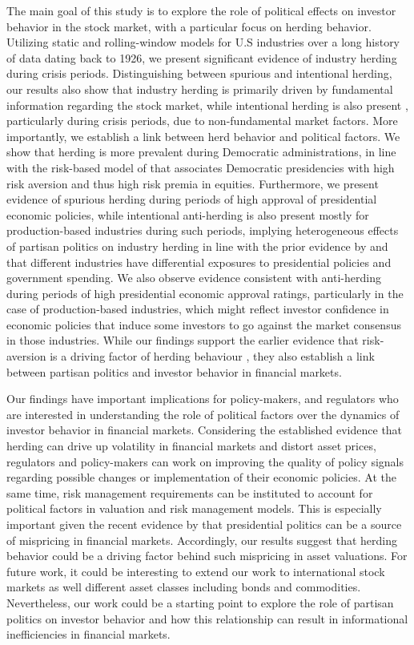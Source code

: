 \documentclass[
  letterpaper,
  DIV=11,
  numbers=noendperiod]{scrartcl}
\begin{document}
The main goal of this study is to explore the role of political effects
on investor behavior in the stock market, with a particular focus on
herding behavior. Utilizing static and rolling-window models for U.S
industries over a long history of data dating back to 1926, we present
significant evidence of industry herding during crisis periods.
Distinguishing between spurious and intentional herding, our results
also show that industry herding is primarily driven by fundamental
information regarding the stock market, while intentional herding is
also present , particularly during crisis periods, due to
non-fundamental market factors. More importantly, we establish a link
between herd behavior and political factors. We show that herding is
more prevalent during Democratic administrations, in line with the
risk-based model of \citet{pastor2020political} that associates
Democratic presidencies with high risk aversion and thus high risk
premia in equities. Furthermore, we present evidence of spurious herding
during periods of high approval of presidential economic policies, while
intentional anti-herding is also present mostly for production-based
industries during such periods, implying heterogeneous effects of
partisan politics on industry herding in line with the prior evidence by
\citet{belo2013government} and \citet{addoum2016political} that
different industries have differential exposures to presidential
policies and government spending. We also observe evidence consistent
with anti-herding during periods of high presidential economic approval
ratings, particularly in the case of production-based industries, which
might reflect investor confidence in economic policies that induce some
investors to go against the market consensus in those industries. While
our findings support the earlier evidence that risk-aversion is a
driving factor of herding behaviour \citep[e.g.][]{nath2020investor},
they also establish a link between partisan politics and investor
behavior in financial markets.

Our findings have important implications for policy-makers, and
regulators who are interested in understanding the role of political
factors over the dynamics of investor behavior in financial markets.
Considering the established evidence that herding can drive up
volatility in financial markets and distort asset prices, regulators and
policy-makers can work on improving the quality of policy signals
regarding possible changes or implementation of their economic policies.
At the same time, risk management requirements can be instituted to
account for political factors in valuation and risk management models.
This is especially important given the recent evidence by
\citet{chen2023presidential} that presidential politics can be a source
of mispricing in financial markets. Accordingly, our results suggest
that herding behavior could be a driving factor behind such mispricing
in asset valuations. For future work, it could be interesting to extend
our work to international stock markets as well different asset classes
including bonds and commodities. Nevertheless, our work could be a
starting point to explore the role of partisan politics on investor
behavior and how this relationship can result in informational
inefficiencies in financial markets.
\end{document}
